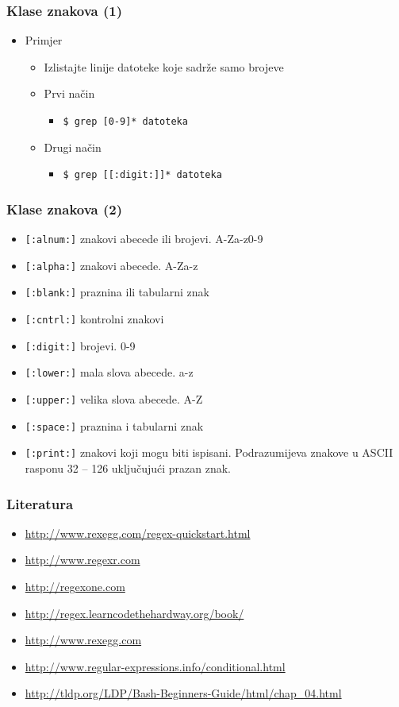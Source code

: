 \documentclass[table,usenames,dvipsnames]{beamer}
\newcommand{\shell}[1]{\texttt{#1}}
\begin{document}
\begin{frame}[t]
\frametitle{Klase znakova (1)}
\begin{itemize}
  \item Primjer
  \begin{itemize}
    \item Izlistajte linije datoteke koje sadrže samo brojeve
    \item Prvi način
    \begin{itemize}
      \item[] \shell{\$ grep [0-9]* datoteka}
    \end{itemize}
    \item Drugi način
    \begin{itemize}
      \item[] \shell{\$ grep [[:digit:]]* datoteka}
    \end{itemize}
  \end{itemize}
\end{itemize}
\end{frame}

\begin{frame}[t]
\frametitle{Klase znakova (2)}
\begin{itemize}
  \item \shell{[:alnum:]} znakovi abecede ili brojevi. A-Za-z0-9
  \item \shell{[:alpha:]} znakovi abecede. A-Za-z 
  \item \shell{[:blank:]} praznina ili tabularni znak
  \item \shell{[:cntrl:]} kontrolni znakovi
  \item \shell{[:digit:]} brojevi. 0-9
  \item \shell{[:lower:]} mala slova abecede. a-z
  \item \shell{[:upper:]} velika slova abecede. A-Z
  \item \shell{[:space:]} praznina i tabularni znak
  \item \shell{[:print:]} znakovi koji mogu biti ispisani. Podrazumijeva 
        znakove u ASCII rasponu 32 – 126 uključujući prazan znak.
\end{itemize}
\end{frame}

\begin{frame}[t]
\frametitle{Literatura}
\begin{itemize}
  \item[] \small\url{http://www.rexegg.com/regex-quickstart.html}
  \item[] \small\url{http://www.regexr.com}
  \item[] \small\url{http://regexone.com}
  \item[] \small\url{http://regex.learncodethehardway.org/book/}
  \item[] \small\url{http://www.rexegg.com}
  \item[] \small\url{http://www.regular-expressions.info/conditional.html} 
  \item[] \small\url{http://tldp.org/LDP/Bash-Beginners-Guide/html/chap_04.html}
\end{itemize}
\end{frame}
\end{document}
